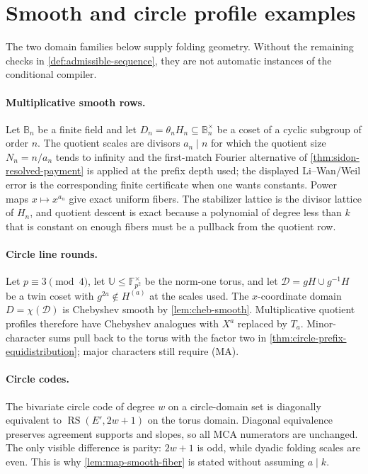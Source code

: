 \documentclass[12pt,a4paper]{amsart}
\numberwithin{equation}{section}
\theoremstyle{remark}
\DeclareMathOperator{\RS}{RS}
\newcommand{\F}{\mathbb F}
\newcommand{\B}{\mathbb B}
\newcommand{\Dcal}{\mathcal D}
\newcommand{\UU}{\mathbb U}
\begin{document}
\section{Smooth and circle profile examples}\label{sec:examples}

The two domain families below supply folding geometry.  Without the
remaining checks in \cref{def:admissible-sequence}, they are not automatic
instances of the conditional compiler.

\paragraph{Multiplicative smooth rows.}
Let \(\B_n\) be a finite field and let \(D_n=\theta_nH_n\subseteq\B_n^\times\) be a coset of a cyclic subgroup of order \(n\).  The quotient scales are divisors \(a_n\mid n\) for which the quotient size \(N_n=n/a_n\) tends to infinity and the first-match Fourier alternative of \cref{thm:sidon-resolved-payment} is applied at the prefix depth used; the displayed Li--Wan/Weil error is the corresponding finite certificate when one wants constants.  Power maps \(x\mapsto x^{a_n}\) give exact uniform fibers.  The stabilizer lattice is the divisor lattice of \(H_n\), and quotient descent is exact because a polynomial of degree less than \(k\) that is constant on enough fibers must be a pullback from the quotient row.

\paragraph{Circle line rounds.}
Let \(p\equiv3\pmod4\), let \(\UU\le\F_{p^2}^\times\) be the norm-one
torus, and let \(\Dcal=gH\cup g^{-1}H\) be a twin coset with
\(g^{2a}\notin H^{(a)}\) at the scales used.  The \(x\)-coordinate domain
\(D=\chi(\Dcal)\) is Chebyshev smooth by \cref{lem:cheb-smooth}.
Multiplicative quotient profiles therefore have Chebyshev analogues with
\(X^a\) replaced by \(T_a\).  Minor-character sums pull back to the torus
with the factor two in \cref{thm:circle-prefix-equidistribution}; major
characters still require \textup{(MA)}.

\paragraph{Circle codes.}
The bivariate circle code of degree \(w\) on a circle-domain set is
diagonally equivalent to \(\RS(E',2w+1)\) on the torus domain.  Diagonal
equivalence preserves agreement supports and slopes, so all MCA numerators
are unchanged.  The only visible difference is parity: \(2w+1\) is odd,
while dyadic folding scales are even.  This is why
\cref{lem:map-smooth-fiber} is stated without assuming \(a\mid k\).
\end{document}
